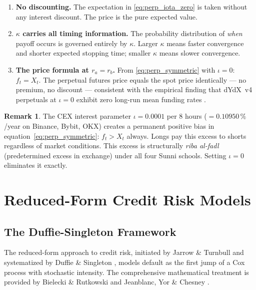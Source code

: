 \documentclass[10pt,twocolumn]{article}
\theoremstyle{plain}
\theoremstyle{definition}
\newtheorem{remark}{Remark}
\begin{document}
\begin{enumerate}[leftmargin=*,noitemsep]
\item \textbf{No discounting.} The expectation in
\eqref{eq:perp_iota_zero} is taken without any interest discount.
The price is the pure expected value.

\item \textbf{$\kappa$ carries all timing information.} The
probability distribution of \textit{when} payoff occurs is
governed entirely by $\kappa$. Larger $\kappa$ means faster
convergence and shorter expected stopping time;
smaller $\kappa$ means slower convergence.

\item \textbf{The price formula at $r_a = r_b$.}
From \eqref{eq:perp_symmetric} with $\iota = 0$: $f_t = X_t$.
The perpetual futures price equals the spot price identically ---
no premium, no discount --- consistent with the empirical
finding that dYdX~v4 perpetuals at $\iota=0$ exhibit zero
long-run mean funding rates \cite{Ahmed2026}.
\end{enumerate}

\begin{remark}
The CEX interest parameter $\iota = 0.0001$ per 8 hours
($= 0.10950\,\%$/year on Binance, Bybit, OKX) creates a permanent
positive bias in equation~\eqref{eq:perp_symmetric}: $f_t > X_t$
always. Longs pay this excess to shorts regardless of market
conditions. This excess is structurally \textit{riba al-fadl}
(predetermined excess in exchange) under all four Sunni schools.
Setting $\iota = 0$ eliminates it exactly.
\end{remark}

\section{Reduced-Form Credit Risk Models}
\label{sec:credit}

\subsection{The Duffie-Singleton Framework}

The reduced-form approach to credit risk, initiated by Jarrow \&
Turnbull \cite{JarrowTurnbull1995} and systematized by Duffie \&
Singleton \cite{DuffieSingleton1999,DuffieSingleton2003}, models
default as the first jump of a Cox process with stochastic intensity.
The comprehensive mathematical treatment is provided by Bielecki \&
Rutkowski \cite{BieleckiRutkowski2002} and Jeanblanc, Yor \& Chesney
\cite{JeanblanYorChesney2009}.
\end{document}
